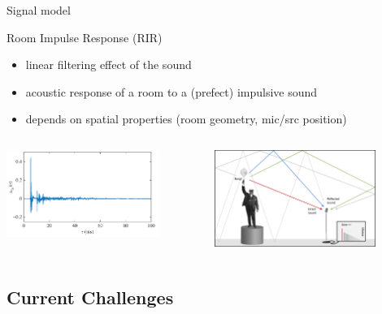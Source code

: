\begin{frame}[t]{Signal model}
    \begin{mydefblock}{Room Impulse Response (RIR)}
        \begin{itemize}
            \item linear filtering effect of the sound
            \item acoustic response of a room to a (prefect) impulsive sound
            \item depends on spatial properties (room geometry, mic/src position)
        \end{itemize}
    \end{mydefblock}

    \begin{columns}
            \centering
            \includegraphics[width=0.8\textwidth]{figures/rir_measured.png}

            \centering
            \includegraphics[width=0.8\textwidth]{figures/rir_bang.png}

    \end{columns}

\end{frame}


\subsection{Current Challenges}

